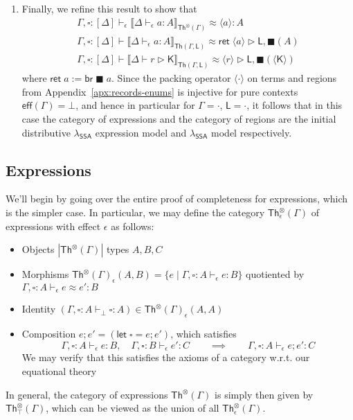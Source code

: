 \documentclass[acmsmall,screen,review]{acmart}
\newcommand{\ms}[1]{\ensuremath{\mathsf{#1}}}
\newcommand{\brb}[2]{\ms{br}\;#1\;#2}
\newcommand{\bhyp}[2]{#1 : #2}
\newcommand{\hasty}[4]{#1 \vdash_{#2} #3: {#4}}
\newcommand{\haslb}[3]{#1 \vdash #2 \rhd #3}
\newcommand{\teqv}{\approx}
\newcommand{\tmeq}[5]{#1 \vdash_{#2} #3 \teqv #4 : {#5}}
\newcommand{\lbeq}[4]{#1 \vdash #2 \teqv #3 \rhd {#4}}
\newcommand{\dnt}[1]{\llbracket{#1}\rrbracket}
\newcommand{\invar}{\square}
\newcommand{\outlb}{\blacksquare}
\newcommand{\pckd}[1]{\langle #1 \rangle}
\newcommand{\isotopessa}{\(\lambda_{\ms{SSA}}\)}
\begin{document}
\begin{enumerate}
  \item Finally, we refine this result to show that
  \begin{equation}
    \begin{gathered}
    \tmeq{\Gamma, \invar : [\Delta]}{\epsilon}
      {\dnt{\hasty{\Delta}{\epsilon}{a}{A}}_{\ms{Th}^\otimes(\Gamma)}}{\pckd{a}}{A}
    \\
    \lbeq{\Gamma, \invar : [\Delta]}
      {\dnt{\hasty{\Delta}{\epsilon}{a}{A}}_{\ms{Th}(\Gamma, \ms{L})}}{\ms{ret}\;\pckd{a}}
      {\ms{L}, \outlb(A)}
    \\
    \lbeq{\Gamma, \invar : [\Delta]}
      {\dnt{\haslb{\Delta}{r}{\ms{K}}}_{\ms{Th}(\Gamma, \ms{L})}}
      {\pckd{r}}{\ms{L}, \outlb(\pckd{\ms{K}})}
    \end{gathered}
  \end{equation}
  where $\ms{ret}\;a := \brb{\outlb}{a}$. Since the packing operator $\pckd{\cdot}$ on terms and
  regions from Appendix~\ref{apx:records-enums} is injective for pure contexts $\ms{eff}(\Gamma) =
  \bot$, and hence in particular for $\Gamma = \cdot$, $\ms{L} = \cdot$, it follows that in this
  case the category of expressions and the category of regions are the initial distributive
  \isotopessa{} expression model and \isotopessa{} model respectively.
\end{enumerate}

\subsection{Expressions}

We'll begin by going over the entire proof of completeness for expressions, which is the simpler
case. In particular, we may define the category $\ms{Th}_\epsilon^\otimes(\Gamma)$ of expressions
with effect $\epsilon$ as follows:
\begin{itemize}
  \item Objects $|\ms{Th}^\otimes(\Gamma)|$ types $A, B, C$
  \item Morphisms $\ms{Th}^\otimes(\Gamma)_\epsilon(A, B) = \{e \mid \hasty{\Gamma,
    \bhyp{\invar}{A}}{\epsilon}{e}{B}\}$ quotiented by $\tmeq{\Gamma,
    \bhyp{\invar}{A}}{\epsilon}{e}{e'}{B}$
  \item Identity $(\hasty{\Gamma, \bhyp{\invar}{A}}{\bot}{\invar}{A}) \in
  \ms{Th}^\otimes(\Gamma)_\epsilon(A, A)$
  \item Composition $e;e' = (\ms{let}\;\invar = e; e')$, which satisfies
  $$
  \hasty{\Gamma, \bhyp{\invar}{A}}{\epsilon}{e}{B}, \quad
  \hasty{\Gamma, \bhyp{\invar}{B}}{\epsilon}{e'}{C} \qquad \implies \qquad
  \hasty{\Gamma, \bhyp{\invar}{A}}{\epsilon}{e;e'}{C}
  $$
  We may verify that this satisfies the axioms of a category w.r.t. our equational theory
\end{itemize}
In general, the category of expressions $\ms{Th}^\otimes(\Gamma)$ is simply then given by
$\ms{Th}_\top^\otimes(\Gamma)$, which can be viewed as the union of all
$\ms{Th}_\epsilon^\otimes(\Gamma)$.
\end{document}
